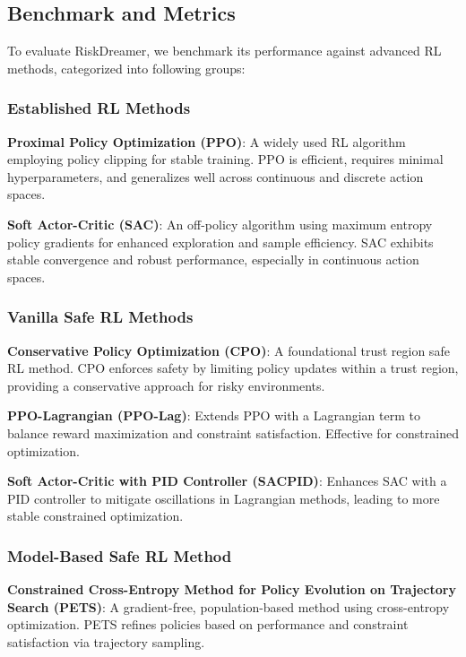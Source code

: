 




\subsection{Benchmark and Metrics}



To evaluate RiskDreamer, we benchmark its performance against advanced RL methods, categorized into following groups:

\subsubsection{Established RL Methods} 

\textbf{Proximal Policy Optimization (PPO)}\cite{PPO}: A widely used RL algorithm employing policy clipping for stable training. PPO is efficient, requires minimal hyperparameters, and generalizes well across continuous and discrete action spaces.

\textbf{Soft Actor-Critic (SAC)}\cite{SAC}: An off-policy algorithm using maximum entropy policy gradients for enhanced exploration and sample efficiency. SAC exhibits stable convergence and robust performance, especially in continuous action spaces.


\subsubsection{Vanilla Safe RL Methods}

    \textbf{Conservative Policy Optimization (CPO)}\cite{CPO}: A foundational trust region safe RL method. CPO enforces safety by limiting policy updates within a trust region, providing a conservative approach for risky environments.

    \textbf{PPO-Lagrangian (PPO-Lag)}\cite{PPO}: Extends PPO with a Lagrangian term to balance reward maximization and constraint satisfaction. Effective for constrained optimization.

    \textbf{Soft Actor-Critic with PID Controller (SACPID)}\cite{SACPID}:  Enhances SAC with a PID controller to mitigate oscillations in Lagrangian methods, leading to more stable constrained optimization.

\subsubsection{Model-Based Safe RL Method}
    \textbf{Constrained Cross-Entropy Method for Policy Evolution on Trajectory Search (PETS)}\cite{CCEPETS}: A gradient-free, population-based method using cross-entropy optimization. PETS refines policies based on performance and constraint satisfaction via trajectory sampling.

